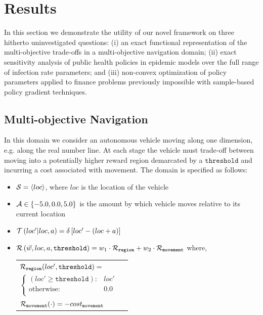 \section{Results}
\label{sec:results}

In this section we demonstrate the utility of our novel framework on three hitherto uninvestigated questions: (i) an exact functional representation of the multi-objective trade-offs in a multi-objective navigation domain; (ii) exact sensitivity analysis of public health policies in epidemic models over the full range of infection rate parameters; and (iii) non-convex optimization of policy parameters applied to finance problems previously impossible with sample-based policy gradient techniques.

\subsection{Multi-objective Navigation}
\label{sec:results_navigation}

In this domain we consider an autonomous vehicle moving along one dimension, e.g. along the real number line. At each stage the vehicle must trade-off between moving into a potentially higher reward region demarcated by a {\footnotesize $ \mathtt{threshold} $} and incurring a cost associated with movement. The domain is specified as follows:
\begin{itemize}
    \item {\footnotesize $ \mathcal{S} = \left\langle loc \right\rangle$}, where $ loc $ is the location of the vehicle
    \item {\footnotesize $ \mathcal{A} \in \left\lbrace -5.0, 0.0, 5.0 \right\rbrace $} is the amount by which vehicle moves relative to its current location
    \item {\footnotesize $ \mathcal{T}\left( loc' | loc, a \right) = \delta \left[ loc' - (loc + a) \right] $}
    \item {\footnotesize $ \mathcal{R}\left(\vec{w}, loc, a, \mathtt{threshold} \right) = w_1 \cdot \mathcal{R}_{\mathtt{region}} + w_2 \cdot \mathcal{R}_{\mathtt{movement}} $} where, \\
    {\footnotesize 
        \abovedisplayskip=10pt
        \belowdisplayskip=0pt
        \renewcommand{\arraystretch}{1.5}
        \begin{tabular}{ll}    
            $ \mathcal{R}_{\mathtt{region}}(loc', \mathtt{threshold}) = $ &  $ $ \\
                \qquad $ \begin{cases}
                (loc' \geq \mathtt{threshold}) : & loc' \\
                \text{otherwise} : & 0.0 \\
                \end{cases} $ & $ $\\
            $ \mathcal{R}_{\mathtt{movement}}(\cdot) = -cost_{\mathtt{movement}} $ & $ $ \\                        
        \end{tabular}
    }    
\end{itemize} 

